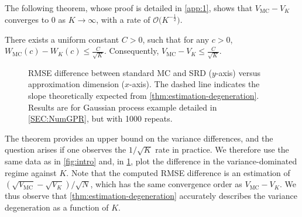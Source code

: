 \documentclass[%
onefignum,onetabnum]{siamonline250211}
\newcommand{\cO}{\mathcal O} \newcommand{\cP}{\mathcal P}
\begin{document}
The following theorem, whose proof is detailed in \cref{app:1}, shows that $V_{\mathrm{MC}}-V_K$ converges to $0$ as $K\to\infty$, with a rate of $\cO \big( K^{-\frac{1}{2}} \big)$.

\begin{theorem}\label{thm:estimation-degeneration}
    There exists a uniform constant $C>0$, such that for any $c>0$, $W_{\mathrm{MC}}(c)-W_K(c)\leq \frac{C}{\sqrt{K}}$. Consequently, $V_{\mathrm{MC}}-V_K\leq \frac{C}{\sqrt{K}}$. 
\end{theorem}

\begin{figure}[tbp]
    \centering
    \caption{RMSE difference between standard MC and SRD ($y$-axis) versus approximation dimension ($x$-axis). The dashed line indicates the slope theoretically expected from \cref{thm:estimation-degeneration}. Results are for Gaussian process example detailed in \cref{SEC:NumGPR}, but with 1000 repeats.}\label{fig:var_diff}
\end{figure}

The theorem provides an upper bound on the variance differences, and the question arises if one observes the $1/\sqrt{K}$ rate in practice. We therefore use the same data as in \cref{fig:intro} and, in \cref{fig:var_diff}, plot the difference in the variance-dominated regime against $K$.
Note that the computed RMSE difference is an estimation of $(\sqrt{V_{\mathrm{MC}}}-\sqrt{V_K})/\sqrt{N}$, which has the same convergence order as $V_{\mathrm{MC}}-V_K$. We thus observe that \cref{thm:estimation-degeneration} accurately describes the variance degeneration as a function of $K$.
\end{document}
